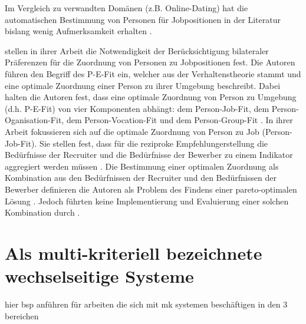 Im Vergleich zu verwandten Domänen (z.B. Online-Dating) hat die automatischen Bestimmung von Personen für Jobpositionen in der Literatur bislang wenig Aufmerksamkeit erhalten \cite[S. 1469]{yildirim:article}.

\textcite[S. 1ff.]{malinowski:2006} stellen in ihrer Arbeit die Notwendigkeit der Berücksichtigung bilateraler Präferenzen für die Zuordnung von Personen zu Jobpositionen fest.
Die Autoren führen den Begriff des \ac{P-E-Fit} ein, welcher aus der Verhaltenstheorie \cite[S. 3]{malinowski:2006} stammt und eine optimale Zuordnung einer Person zu ihrer Umgebung beschreibt.
Dabei halten die Autoren fest, dass eine optimale Zuordnung von Person zu Umgebung (d.h. \ac{P-E-Fit}) von vier Komponenten abhängt: dem Person-Job-Fit, dem Person-Oganisation-Fit, dem Person-Vocation-Fit und dem Person-Group-Fit \cite[S. 3]{malinowski:2006}.
In ihrer Arbeit fokussieren sich \textcite[S. 4]{malinowski:2006} auf die optimale Zuordnung von Person zu Job (Person-Job-Fit).
Sie stellen fest, dass für die reziproke Empfehlungerstellung die Bedürfnisse der Recruiter und die Bedürfnisse der Bewerber zu einem Indikator \cite[S. 922]{siting:2012} aggregiert werden müssen \cite[S. 5]{malinowski:2006}.
Die Bestimmung einer optimalen Zuordnung als Kombination aus den Bedürfnissen der Recruiter und den Bedürfnissen der Bewerber definieren die Autoren als Problem des Findens einer pareto-optimalen Lösung \cite[S. 5]{malinowski:2006}.
Jedoch führten \textcite[S. 1ff.]{malinowski:2006} keine Implementierung und Evaluierung einer solchen Kombination durch \cite[S. 549]{koprinska:inbook}.



\section{Als multi-kriteriell bezeichnete wechselseitige Systeme}
hier bsp anführen für arbeiten die sich mit mk systemen beschäftigen in den 3 bereichen

